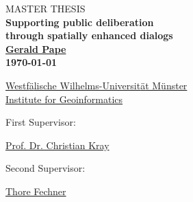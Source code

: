 \onecolumn

\thispagestyle{empty}

\begin{center}
 
\vspace*{5cm}

\textsc{\large MASTER THESIS}\\[1cm]


{ \Huge \textbf{Supporting public deliberation}}\\[0.2cm]
{ \Huge \textbf{through spatially enhanced dialogs}}\\[2.5cm]
 
{\LARGE \textbf{\href{mailto:g.pape@uni-muenster.de}{Gerald Pape}}}\\[1.5cm]
 
{\LARGE \textbf{\today}}\\[5cm]

\end{center}

{\Large
\href{https://www.uni-muenster.de}{Westf{\"a}lische Wilhelms-Universit{\"a}t M{\"u}nster}\\[0.3cm]
\href{http://www.ifgi.de}{Institute for Geoinformatics}\\[0.7cm]

\parbox{4.5cm}{First Supervisor:} \href{mailto:c.kray@uni-muenster.de}{Prof. Dr. Christian Kray}\\[0.3cm]
\parbox{4.5cm}{Second Supervisor:} \href{mailto:t.fechner@uni-muenster.de}{Thore Fechner}
}

\vfill

\newpage



\twocolumn